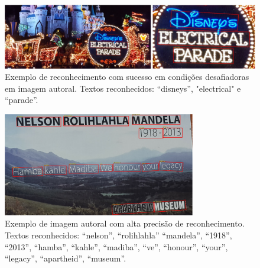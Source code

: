 \begin{figure}
    \centering
    \includegraphics[width=\textwidth]{figs/resultados-autoral-04.png}
    \caption{Exemplo de reconhecimento com sucesso em condições desafiadoras em imagem autoral. Textos reconhecidos: “disneys”, "electrical" e “parade”.}
    \label{fig:results_own_images_04}
\end{figure}

\begin{figure}
    \centering
    \includegraphics[width=0.75\textwidth]{figs/resultados-autoral-05.png}
    \caption{Exemplo de imagem autoral com alta precisão de reconhecimento. Textos reconhecidos: “nelson”, “rolihlahla” “mandela”, “1918”, “2013”, “hamba”, “kahle”, “madiba”, “ve”, “honour”, “your”, “legacy”, “apartheid”, “museum”.}
    \label{fig:results_own_images_05}
\end{figure}
